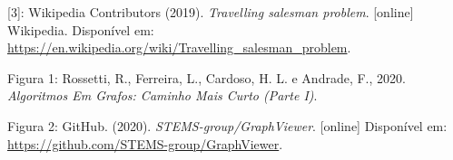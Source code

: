 \documentclass[article, a4paper, 12pt, oneside]{memoir}
\begin{document}
[3]: Wikipedia Contributors (2019). \textit{Travelling salesman problem}. [online] Wikipedia. Disponível em: \url{https://en.wikipedia.org/wiki/Travelling_salesman_problem}.

Figura 1: Rossetti, R., Ferreira, L., Cardoso, H. L. e Andrade, F., 2020. \textit{Algoritmos Em Grafos: Caminho Mais Curto (Parte I)}.

Figura 2: GitHub. (2020). \textit{STEMS-group/GraphViewer}. [online] Disponível em: \url{https://github.com/STEMS-group/GraphViewer}.

‌

‌

\newpage
\end{document}
